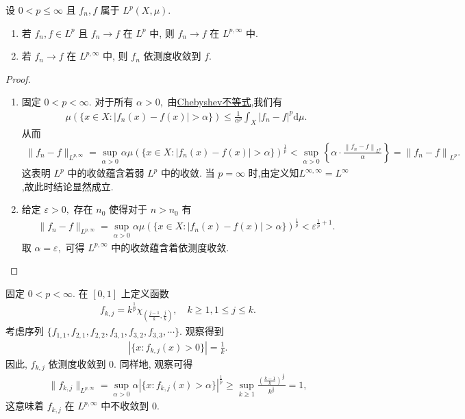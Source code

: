 \documentclass[../../main.tex]{subfiles}%
\begin{document}
\begin{proposition}
设 \(0 < p \leqslant \infty\) 且 \(f_n, f\) 属于 \(L^p(X,\mu)\).
\begin{enumerate}[(1)]
\item 若 \(f_n, f \in L^p\) 且 \(f_n \to f\) 在 \(L^p\) 中, 则 \(f_n \to f\) 在 \(L^{p,\infty}\) 中.
\item 若 \(f_n \to f\) 在 \(L^{p,\infty}\) 中, 则 \(f_n\) 依测度收敛到 \(f\).
\end{enumerate}
\end{proposition}
\begin{proof}
\begin{enumerate}[(1)]
\item  固定 \(0 < p < \infty.\) 对于所有 \(\alpha > 0,\) 由\hyperref[Real Analysis-theorem:实分析-Chebyshev不等式]{Chebyshev不等式},我们有
\begin{align*}
\mu(\{x \in X : |f_n(x) - f(x)| > \alpha\}) \leqslant \frac{1}{\alpha^p} \int_X |f_n - f|^p \mathrm{d}\mu.
\end{align*}
从而
\begin{align*}
\parallel f_n-f\parallel _{L^{p,\infty}}=\mathop {\mathrm{sup}} \limits_{\alpha >0}\alpha \mu (\{x\in X:|f_n(x)-f(x)|>\alpha \})^{\frac{1}{p}}<\mathop {\mathrm{sup}} \limits_{\alpha >0}\left\{ \alpha \cdot \frac{\left\| f_n-f \right\| _{L^p}}{\alpha} \right\} =\left\| f_n-f \right\| _{L^p}.
\end{align*}
这表明 \(L^p\) 中的收敛蕴含着弱 \(L^p\) 中的收敛. 当 \(p = \infty\) 时,由定义知$L^{\infty,\infty}=L^{\infty}$,故此时结论显然成立.

\item 给定 \(\varepsilon > 0,\) 存在 \(n_0\) 使得对于 \(n > n_0\) 有
\begin{align*}
\|f_n - f\|_{L^{p,\infty}} = \sup\limits_{\alpha > 0} \alpha \mu(\{x \in X : |f_n(x) - f(x)| > \alpha\})^{\frac{1}{p}} < \varepsilon^{\frac{1}{p}+1}.
\end{align*}
取 \(\alpha = \varepsilon,\) 可得 \(L^{p,\infty}\) 中的收敛蕴含着依测度收敛.
\end{enumerate}
\end{proof}

\begin{example}
固定 \(0 < p < \infty.\) 在 \([0, 1]\) 上定义函数
\begin{align*}
f_{k,j} = k^{\frac{1}{p}} \chi_{\left(\frac{j-1}{k}, \frac{j}{k}\right)}, \quad k \geqslant 1, 1 \leqslant j \leqslant k.
\end{align*}
考虑序列 \(\{f_{1,1}, f_{2,1}, f_{2,2}, f_{3,1}, f_{3,2}, f_{3,3}, \cdots\}.\) 观察得到
\begin{align*}
|\{x : f_{k,j}(x) > 0\}| = \frac{1}{k}.
\end{align*}
因此, \(f_{k,j}\) 依测度收敛到 \(0.\) 同样地, 观察可得
\begin{align*}
\|f_{k,j}\|_{L^{p,\infty}} = \sup\limits_{\alpha > 0} \alpha |\{x : f_{k,j}(x) > \alpha\}|^{\frac{1}{p}} \geqslant \sup\limits_{k \geqslant 1} \frac{\left(\frac{k - 1}{k}\right)^{\frac{1}{p}}}{k^{\frac{1}{p}}} = 1,
\end{align*}
这意味着 \(f_{k,j}\) 在 \(L^{p,\infty}\) 中不收敛到 \(0.\)
\end{example}
\end{document}

